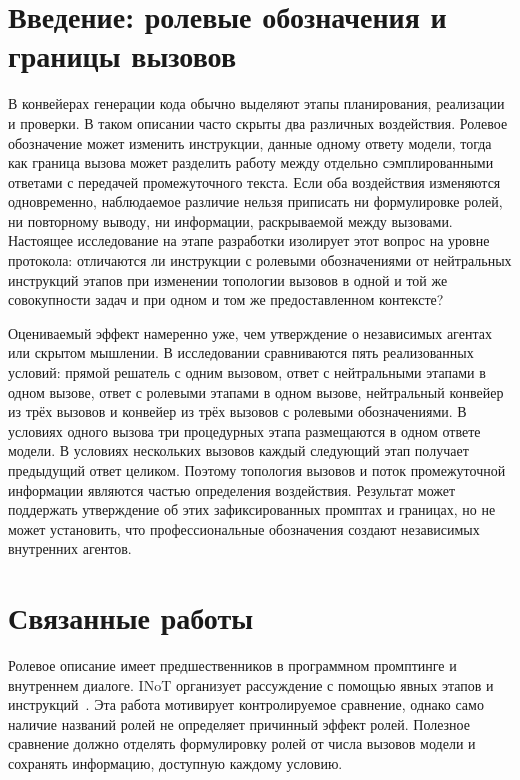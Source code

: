 \section{Введение: ролевые обозначения и границы вызовов}
\label{sec:dev40-context}

В конвейерах генерации кода обычно выделяют этапы планирования, реализации и проверки. В таком описании часто скрыты два различных воздействия. Ролевое обозначение может изменить инструкции, данные одному ответу модели, тогда как граница вызова может разделить работу между отдельно сэмплированными ответами с передачей промежуточного текста. Если оба воздействия изменяются одновременно, наблюдаемое различие нельзя приписать ни формулировке ролей, ни повторному выводу, ни информации, раскрываемой между вызовами. Настоящее исследование на этапе разработки изолирует этот вопрос на уровне протокола: отличаются ли инструкции с ролевыми обозначениями от нейтральных инструкций этапов при изменении топологии вызовов в одной и той же совокупности задач и при одном и том же предоставленном контексте?

Оцениваемый эффект намеренно уже, чем утверждение о независимых агентах или скрытом мышлении. В исследовании сравниваются пять реализованных условий: прямой решатель с одним вызовом, ответ с нейтральными этапами в одном вызове, ответ с ролевыми этапами в одном вызове, нейтральный конвейер из трёх вызовов и конвейер из трёх вызовов с ролевыми обозначениями. В условиях одного вызова три процедурных этапа размещаются в одном ответе модели. В условиях нескольких вызовов каждый следующий этап получает предыдущий ответ целиком. Поэтому топология вызовов и поток промежуточной информации являются частью определения воздействия. Результат может поддержать утверждение об этих зафиксированных промптах и границах, но не может установить, что профессиональные обозначения создают независимых внутренних агентов.

\section{Связанные работы}
\label{sec:dev40-related}

Ролевое описание имеет предшественников в программном промптинге и внутреннем диалоге. INoT организует рассуждение с помощью явных этапов и инструкций~\cite{sun2025inot}. Эта работа мотивирует контролируемое сравнение, однако само наличие названий ролей не определяет причинный эффект ролей. Полезное сравнение должно отделять формулировку ролей от числа вызовов модели и сохранять информацию, доступную каждому условию.

